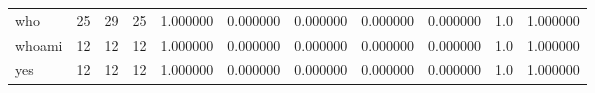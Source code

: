 \begin{longtable}{lrrrrrrrrrr}
who       &                                      25 &                 29 &                                25 &                                   1.000000 &                               0.000000 &                                     0.000000 &                          0.000000 &                                0.000000 &                                1.0 &                                           1.000000 \\
whoami    &                                      12 &                 12 &                                12 &                                   1.000000 &                               0.000000 &                                     0.000000 &                          0.000000 &                                0.000000 &                                1.0 &                                           1.000000 \\
yes       &                                      12 &                 12 &                                12 &                                   1.000000 &                               0.000000 &                                     0.000000 &                          0.000000 &                                0.000000 &                                1.0 &                                           1.000000 \\
\end{longtable}
